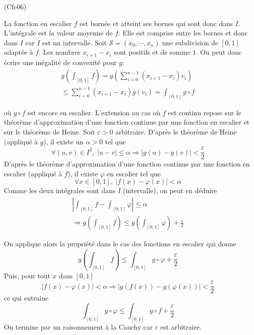 \begin{tiny}(Cfc06)\end{tiny} La fonction en escalier $f$ est bornée et atteint ses bornes qui sont donc dans $I$. L'intégrale est la valeur moyenne de $f$. Elle est comprise entre les bornes et donc dans $I$ car $I$ est un intervalle.\newline
Soit $\mathcal{S}=(x_0,\cdots,x_n)$ une subdivision de $[0,1]$ adaptée à $f$. Les nombres $x_{i+1}-x_i$ sont positifs et de somme $1$. On peut donc écrire une inégalité de convexité pour $g$:
\begin{multline*}
 g\left( \int_{[0,1]}f\right) =g\left(\sum_{i=0}^{n-1}(x_{i+1}-x_i)v_i \right)\\
\leq  \sum_{i=0}^{n-1}(x_{i+1}-x_i)g(v_i)
= \int_{[0,1]}g\circ f
\end{multline*}

 où $g\circ f$ est encore en escalier.\newline
L'extension au cas où $f$ est continu repose sur le théorème d'approximation d'une fonction continue par une fonction en escalier et sur le théorème de Heine.\newline
Soit $\varepsilon>0$ arbitraire. D'après le théorème de Heine (appliqué à $g$), il existe un $\alpha>0$ tel que 
\begin{displaymath}
 \forall (u,v)\in I^2,\; |u-v|\leq\alpha \Rightarrow
|g(u)-g(v)|<\frac{\varepsilon}{2}
\end{displaymath}
D'après le théorème d'approximation d'une fonction continue par une fonction en escalier (appliqué à $f$), il existe $\varphi$ en escalier tel que
\begin{displaymath}
 \forall x\in [0,1],\;|f(x)-\varphi(x)|<\alpha
\end{displaymath}
Comme les deux intégrales sont dans $I$ (intervalle), on peut en déduire
\begin{multline*}
 \left|\int_{[0,1]}f - \int_{[0,1]}\varphi \right|\leq \alpha \\
\Rightarrow g\left( \int_{[0,1]}f\right) \leq  g\left( \int_{[0,1]}\varphi\right) + \frac{\varepsilon}{2}
\end{multline*}

On applique alors la propriété dans le cas des fonctions en escalier qui donne
\begin{displaymath}
 g\left( \int_{[0,1]}f\right) \leq \int_{[0,1]}g\circ \varphi + \frac{\varepsilon}{2}
\end{displaymath}
Puis, pour tout $x$ dans $[0,1]$
\begin{displaymath}
 |f(x)-\varphi(x)|<\alpha \Rightarrow
|g(f(x))-g(\varphi(x))|<\frac{\varepsilon}{2}
\end{displaymath}
ce qui entraine
\begin{displaymath}
 \int_{[0,1]}g\circ \varphi \leq \int_{[0,1]}g\circ f + \frac{\varepsilon}{2}
\end{displaymath}
On termine par un raisonnement à la Cauchy car $\varepsilon$ est arbitraire.
